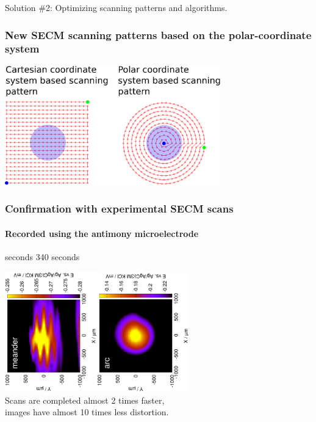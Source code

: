 \documentclass{beamer}
\begin{document}
\begin{frame} [plain]
\centering
Solution \#2:
Optimizing scanning patterns and algorithms.
\end{frame}

\begin{frame}
	\frametitle{New SECM scanning patterns based on the polar-coordinate system}
	\centering	
	\includegraphics[width=0.7\textwidth]{cartesian_vs_polar.eps}
	
	\vfill
\end{frame}

\begin{frame}
	\centering
	\frametitle{Confirmation with experimental SECM scans}
	\framesubtitle{Recorded using the antimony microelectrode}
	\quad\quad\quad\quad{} seconds \hfill 340 seconds \quad\quad\quad\quad\quad\quad


	\includegraphics[width=0.3\textwidth, angle=-90]{meander.eps}\includegraphics[width=0.3\textwidth, angle=-90]{arc.eps}\\
	\vfill
	Scans are completed almost 2 times faster,\\ images have almost 10 times less distortion.
\end{frame}
\end{document}
